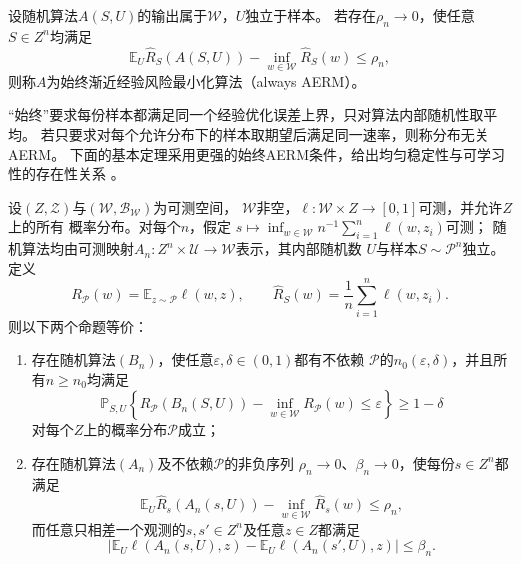 \begin{definition}[始终渐近经验风险最小化]
\label{def:aerm}
设随机算法$A(S,U)$的输出属于$\mathcal W$，$U$独立于样本。
若存在$\rho_n\to0$，使任意$S\in Z^n$均满足
\[
 \mathbb E_U\hat R_S(A(S,U))-\inf_{w\in\mathcal W}\hat R_S(w)\leq\rho_n,
\]
则称$A$为始终渐近经验风险最小化算法（always AERM）。
\end{definition}

“始终”要求每份样本都满足同一个经验优化误差上界，只对算法内部随机性取平均。
若只要求对每个允许分布下的样本取期望后满足同一速率，则称分布无关AERM。
下面的基本定理采用更强的始终AERM条件，给出均匀稳定性与可学习性的存在性关系
。

\begin{theorem}
\label{thm:general-stability-characterization}
设$(Z,\mathcal Z)$与$(\mathcal W,\mathcal B_{\mathcal W})$为可测空间，
$\mathcal W$非空，$\ell:\mathcal W\times Z\to[0,1]$可测，并允许$Z$上的所有
概率分布。对每个$n$，假定
$s\mapsto\inf_{w\in\mathcal W}n^{-1}\sum_{i=1}^n\ell(w,z_i)$可测；
随机算法均由可测映射$A_n:Z^n\times\mathcal U\to\mathcal W$表示，其内部随机数
$U$与样本$S\sim\mathcal P^n$独立。定义
\[
 R_{\mathcal P}(w)=\mathbb E_{z\sim\mathcal P}\ell(w,z),
 \qquad
 \hat R_S(w)=\frac1n\sum_{i=1}^n\ell(w,z_i).
\]
则以下两个命题等价：
\begin{enumerate}
 \item 存在随机算法$(B_n)$，使任意$\varepsilon,\delta\in(0,1)$都有不依赖
 $\mathcal P$的$n_0(\varepsilon,\delta)$，并且所有$n\geq n_0$均满足
 \[
  \mathbb P_{S,U}\!\left\{
  R_{\mathcal P}(B_n(S,U))-\inf_{w\in\mathcal W}R_{\mathcal P}(w)
  \leq\varepsilon\right\}\geq1-\delta
 \]
 对每个$Z$上的概率分布$\mathcal P$成立；
 \item 存在随机算法$(A_n)$及不依赖$\mathcal P$的非负序列
 $\rho_n\to0$、$\beta_n\to0$，使每份$s\in Z^n$都满足
 \[
  \mathbb E_U\hat R_s(A_n(s,U))
  -\inf_{w\in\mathcal W}\hat R_s(w)\leq\rho_n,
 \]
 而任意只相差一个观测的$s,s'\in Z^n$及任意$z\in Z$都满足
 \[
  \left|\mathbb E_U\ell(A_n(s,U),z)
  -\mathbb E_U\ell(A_n(s',U),z)\right|\leq\beta_n.
 \]
\end{enumerate}
\end{theorem}
